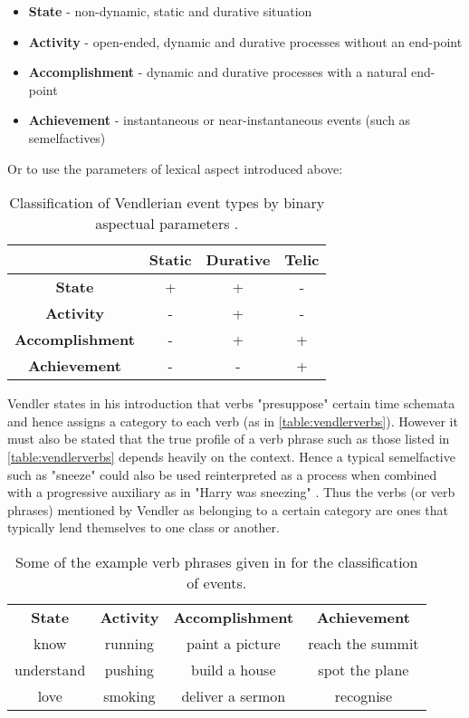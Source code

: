 \begin{itemize}
    \item \textbf{State} - non-dynamic, static and durative situation
    \item \textbf{Activity} - open-ended, dynamic and durative processes without an end-point
    \item \textbf{Accomplishment} - dynamic and durative processes with a natural end-point
    \item \textbf{Achievement} - instantaneous or near-instantaneous events (such as semelfactives)
\end{itemize}

Or to use the parameters of lexical aspect introduced above:
\begin{table}
    \centering
    \begin{tabular}{|c||c|c|c|}
        \hline
                                & Static & Durative & Telic \\ \hline
        \textbf{State}          & +      & +        & - \\ \hline
        \textbf{Activity}       & -      & +        & - \\ \hline
        \textbf{Accomplishment} & -      & +        & + \\ \hline
        \textbf{Achievement}    & -      & -        & + \\ \hline
    \end{tabular}
    \caption{Classification of Vendlerian event types by binary aspectual parameters \citep{Smith1991ThePO}.}
\end{table}

Vendler states in his introduction that verbs "presuppose" certain time schemata and hence assigns a category to each verb (as in \ref{table:vendlerverbs}). However it must also be stated that the true profile of a verb phrase such as those listed in \ref{table:vendlerverbs} depends heavily on the context. Hence a typical semelfactive such as "sneeze" could also be used reinterpreted as a process when combined with a progressive auxiliary as in "Harry was sneezing" \citep{moens-steedman-1988-temporal}. Thus the verbs (or verb phrases) mentioned by Vendler as belonging to a certain category are ones that typically lend themselves to one class or another.

\begin{table}
    \centering
    \begin{tabular}{|c|c|c|c|}
        
        \textbf{State} & \textbf{Activity} & \textbf{Accomplishment} & \textbf{Achievement} \\
        know & running & paint a picture & reach the summit \\
        understand & pushing & build a house & spot the plane \\
        love & smoking & deliver a sermon & recognise
    \end{tabular}
    \caption{Some of the example verb phrases given in \citet{vendler57} for the classification of events.}
\end{table}
\label{table:vendlerverbs}

